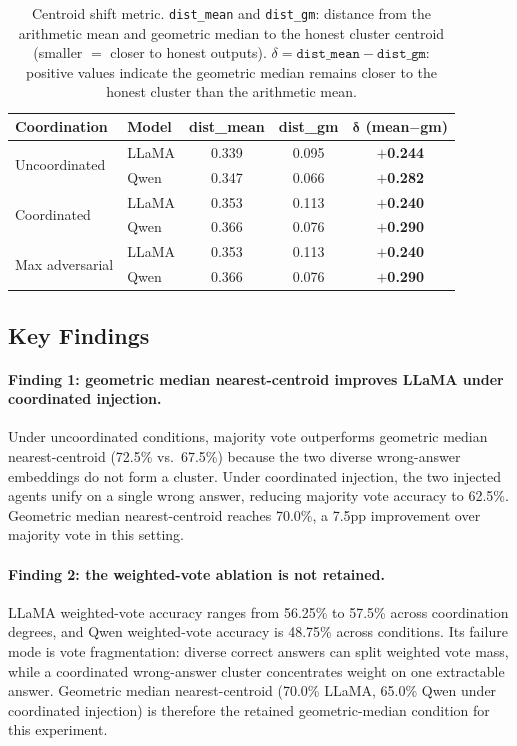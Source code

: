 \documentclass[11pt]{article}
\begin{document}
\begin{table}[h]
\centering
\caption{Centroid shift metric. \texttt{dist\_mean} and \texttt{dist\_gm}: distance
  from the arithmetic mean and geometric median to the honest cluster centroid
  (smaller $=$ closer to honest outputs). $\delta = \texttt{dist\_mean} - \texttt{dist\_gm}$:
  positive values indicate the geometric median remains closer to the honest
  cluster than the arithmetic mean.}
\label{tab:centroid-shift}
\small
\begin{tabular}{llccc}
\toprule
\textbf{Coordination} & \textbf{Model}
  & \textbf{dist\_mean} & \textbf{dist\_gm}
  & $\bm{\delta}$ (mean$-$gm) \\
\midrule
\multirow{2}{*}{Uncoordinated}
  & LLaMA & 0.339 & 0.095 & \textbf{$+$0.244} \\
  & Qwen  & 0.347 & 0.066 & \textbf{$+$0.282} \\
\midrule
\multirow{2}{*}{Coordinated}
  & LLaMA & 0.353 & 0.113 & \textbf{$+$0.240} \\
  & Qwen  & 0.366 & 0.076 & \textbf{$+$0.290} \\
\midrule
\multirow{2}{*}{Max adversarial}
  & LLaMA & 0.353 & 0.113 & \textbf{$+$0.240} \\
  & Qwen  & 0.366 & 0.076 & \textbf{$+$0.290} \\
\bottomrule
\end{tabular}
\end{table}

\subsection{Key Findings}
\label{sec:exp3-findings}

\paragraph{Finding 1: geometric median nearest-centroid improves LLaMA under
coordinated injection.}
Under uncoordinated conditions, majority vote outperforms geometric median
nearest-centroid (72.5\% vs.\ 67.5\%) because the two diverse wrong-answer
embeddings do not form a cluster. Under coordinated injection, the two injected
agents unify on a single wrong answer, reducing majority vote accuracy to 62.5\%.
Geometric median nearest-centroid reaches 70.0\%, a 7.5pp improvement over
majority vote in this setting.

\paragraph{Finding 2: the weighted-vote ablation is not retained.}
LLaMA weighted-vote accuracy ranges from 56.25\% to 57.5\% across coordination
degrees, and Qwen weighted-vote accuracy is 48.75\% across conditions. Its
failure mode is vote fragmentation: diverse correct answers can split weighted
vote mass, while a coordinated wrong-answer cluster concentrates weight on one
extractable answer. Geometric median nearest-centroid (70.0\% LLaMA, 65.0\%
Qwen under coordinated injection) is therefore the retained geometric-median
condition for this experiment.
\end{document}
